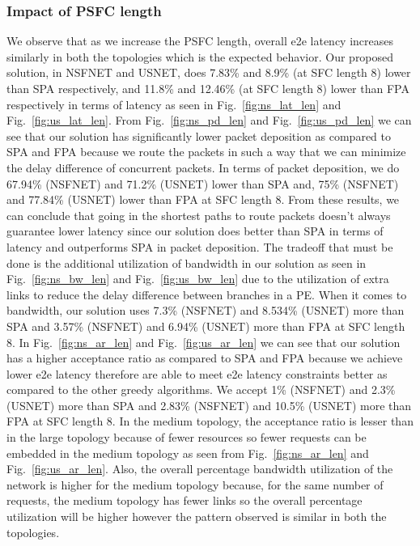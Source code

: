 \documentclass[journal]{IEEEtran}
\begin{document}
\subsubsection{Impact of PSFC length}
We observe that as we increase the PSFC length, overall e2e latency increases similarly in both the topologies which is the expected behavior. Our proposed solution, in NSFNET and USNET, does 7.83\% and 8.9\% (at SFC length 8) lower than SPA respectively, and 11.8\% and 12.46\% (at SFC length 8) lower than FPA respectively in terms of latency as seen in Fig.~\ref{fig:ns_lat_len} and Fig.~\ref{fig:us_lat_len}. From Fig.~\ref{fig:ns_pd_len} and Fig.~\ref{fig:us_pd_len} we can see that our solution has significantly lower packet deposition as compared to SPA and FPA because we route the packets in such a way that we can minimize the delay difference of concurrent packets. In terms of packet deposition, we do 67.94\% (NSFNET) and 71.2\% (USNET) lower than SPA and, 75\% (NSFNET) and 77.84\% (USNET) lower than FPA at SFC length 8. From these results, we can conclude that going in the shortest paths to route packets doesn't always guarantee lower latency since our solution does better than SPA in terms of latency and outperforms SPA in packet deposition. The tradeoff that must be done is the additional utilization of bandwidth in our solution as seen in Fig.~\ref{fig:ns_bw_len} and Fig.~\ref{fig:us_bw_len} due to the utilization of extra links to reduce the delay difference between branches in a PE. When it comes to bandwidth, our solution uses 7.3\% (NSFNET) and 8.534\% (USNET) more than SPA and 3.57\% (NSFNET) and 6.94\% (USNET) more than FPA at SFC length 8. In Fig.~\ref{fig:ns_ar_len} and Fig.~\ref{fig:us_ar_len} we can see that our solution has a higher acceptance ratio as compared to SPA and FPA because we achieve lower e2e latency therefore are able to meet e2e latency constraints better as compared to the other greedy algorithms. We accept 1\% (NSFNET) and 2.3\% (USNET) more than SPA and 2.83\% (NSFNET) and 10.5\% (USNET) more than FPA at SFC length 8. In the medium topology, the acceptance ratio is lesser than in the large topology because of fewer resources so fewer requests can be embedded in the medium topology as seen from Fig.~\ref{fig:ns_ar_len} and Fig.~\ref{fig:us_ar_len}. Also, the overall percentage bandwidth utilization of the network is higher for the medium topology because, for the same number of requests, the medium topology has fewer links so the overall percentage utilization will be higher however the pattern observed is similar in both the topologies.
\end{document}
